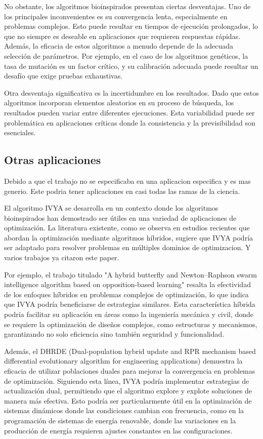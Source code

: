 No obstante, los algoritmos bioinspirados presentan ciertas desventajas. Uno de
los principales inconvenientes es su convergencia lenta, especialmente en
problemas complejos. Esto puede resultar en tiempos de ejecución prolongados,
lo que no siempre es deseable en aplicaciones que requieren respuestas rápidas.
Además, la eficacia de estos algoritmos a menudo depende de la adecuada
selección de parámetros. Por ejemplo, en el caso de los algoritmos genéticos,
la tasa de mutación es un factor crítico, y su calibración adecuada puede
resultar un desafío que exige pruebas exhaustivas.

Otra desventaja significativa es la incertidumbre en los resultados. Dado que
estos algoritmos incorporan elementos aleatorios en su proceso de búsqueda, los
resultados pueden variar entre diferentes ejecuciones. Esta variabilidad puede
ser problemática en aplicaciones críticas donde la consistencia y la
previsibilidad son esenciales.

\subsection{Otras aplicaciones} %
Debido a que el trabajo no se especificaba en una aplicacion especifica y es
mas generio. Este podria tener aplicaciones en casi todas las ramas de la
ciencia.

El algoritmo IVYA se desarrolla en un
contexto donde los algoritmos bioinspirados han demostrado ser útiles en una
variedad de aplicaciones de optimización. La literatura existente, como se
observa en estudios recientes que abordan la optimización mediante algoritmos
híbridos, sugiere que IVYA podría ser adaptado para resolver problemas en
múltiples dominios de optimizacion. Y varios trabajos ya citaron este paper.

Por ejemplo, el trabajo titulado "A hybrid butterfly and Newton–Raphson swarm
intelligence algorithm based on opposition-based learning" resalta la
efectividad de los enfoques híbridos en problemas complejos de optimización, lo
que indica que IVYA podría beneficiarse de estrategias similares. Esta
característica híbrida podría facilitar su aplicación en áreas como la
ingeniería mecánica y civil, donde se requiere la optimización de diseños
complejos, como estructuras y mecanismos, garantizando no solo eficiencia sino
también seguridad y funcionalidad.

Además, el DHRDE (Dual-population hybrid update and RPR mechanism based
differential evolutionary algorithm for engineering applications) demuestra la
eficacia de utilizar poblaciones duales para mejorar la convergencia en
problemas de optimización. Siguiendo esta línea, IVYA podría implementar
estrategias de actualización dual, permitiendo que el algoritmo explore y
explote soluciones de manera más efectiva. Esto podría ser particularmente útil
en la optimización de sistemas dinámicos donde las condiciones cambian con
frecuencia, como en la programación de sistemas de energía renovable, donde las
variaciones en la producción de energía requieren ajustes constantes en las
configuraciones.

